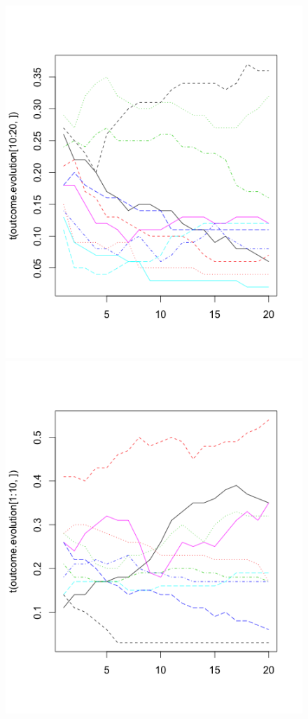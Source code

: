 \documentclass{sig-alternate}
\begin{document}
	\begin{figure}
		\includegraphics[scale = 0.4]{Rplot01.png}
		\includegraphics[scale = 0.4]{Rplot02.png}

\end{figure}
\end{document}

